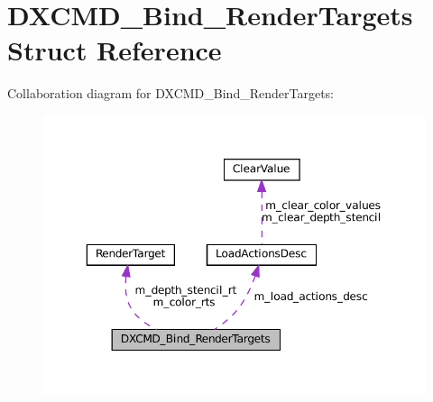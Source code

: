 \hypertarget{structDXCMD__Bind__RenderTargets}{}\section{D\+X\+C\+M\+D\+\_\+\+Bind\+\_\+\+Render\+Targets Struct Reference}
\label{structDXCMD__Bind__RenderTargets}


Collaboration diagram for D\+X\+C\+M\+D\+\_\+\+Bind\+\_\+\+Render\+Targets\+:\nopagebreak
\begin{figure}[H]
\begin{center}
\leavevmode
\includegraphics[width=350pt]{structDXCMD__Bind__RenderTargets__coll__graph}
\end{center}
\end{figure}
